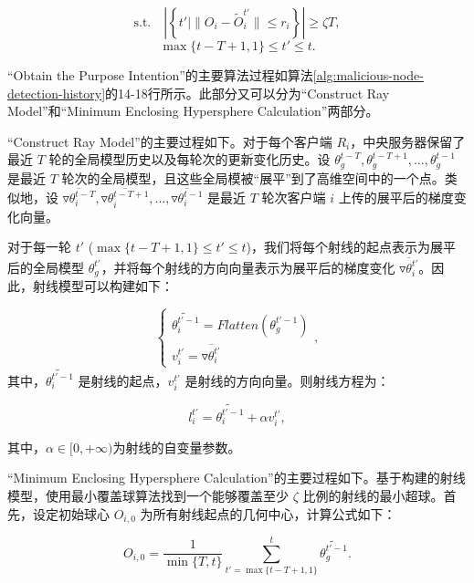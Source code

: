 \documentclass[lettersize,journal]{IEEEtran}
\begin{document}
\begin{enumerate}
\begin{equation} 
\text{s.t.} \quad \left| \left\{ t' \mid \| O_i - \tilde{O}_{i}^{t'} \| \leq r_i \right\} \right| \geq \zeta T,
\end{equation}
\begin{equation} 
    \max\{t-T+1, 1\}\leq  t'\leq t.
\end{equation}

“Obtain the Purpose Intention”的主要算法过程如算法\ref{alg:malicious-node-detection-history}的14-18行所示。此部分又可以分为“Construct Ray Model”和“Minimum Enclosing Hypersphere Calculation”两部分。

“Construct Ray Model”的主要过程如下。对于每个客户端 \(R_i\)，中央服务器保留了最近 \(T\) 轮的全局模型历史以及每轮次的更新变化历史。设 \( \theta_g^{t-T}, \theta_g^{t-T+1}, \dots, \theta_g^{t-1} \) 是最近 \(T\) 轮次的全局模型，且这些全局模被“展平”到了高维空间中的一个点。类似地，设 \( \overline{\triangledown\theta_{i}^{t-T}}, \overline{\triangledown\theta_{i}^{t-T+1}}, \dots, \overline{\triangledown\theta_{i}^{t-1}} \) 是最近 \(T\) 轮次客户端 \(i\) 上传的展平后的梯度变化向量。

对于每一轮 \( t' \) (\( \max\{t-T+1, 1\}\leq  t'\leq t \))，我们将每个射线的起点表示为展平后的全局模型 \( \theta_g^{t'} \)，并将每个射线的方向向量表示为展平后的梯度变化 \( \overline{\triangledown\theta_{i}^{t'}} \)。因此，射线模型可以构建如下：

\begin{equation}
    \left\{\begin{matrix}
    \widetilde{\theta_{i}^{t'-1}} = Flatten(\theta_g^{t'-1})\\
    {v}_{i}^{t'} = \overline{\triangledown\theta_{i}^{t'}}
    \end{matrix}\right.,
\end{equation}
其中，\( \widetilde{\theta_{i}^{t'-1}} \) 是射线的起点，\( {v}_{i}^{t'} \) 是射线的方向向量。则射线方程为：

\begin{equation}
l_i^{t'}=\widetilde{\theta_{i}^{t'-1}}+\alpha {v}_{i}^{t'},
\end{equation}

其中，$\alpha\in [0, +\infty)$为射线的自变量参数。

“Minimum Enclosing Hypersphere Calculation”的主要过程如下。基于构建的射线模型，使用最小覆盖球算法找到一个能够覆盖至少 \( \zeta \) 比例的射线的最小超球。首先，设定初始球心 \( O_{i,0} \) 为所有射线起点的几何中心，计算公式如下：

\begin{equation}
    O_{i,0} = \frac{1}{\min\{T, t\}} \sum_{t'=\max\{t-T+1, 1\}}^{t} \widetilde{\theta_g^{t'-1}}.
\end{equation}


\end{enumerate}
\end{document}
